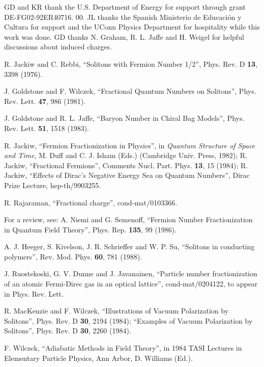 \documentclass[a4paper,prd]{revtex4}
\begin{document}
\begin{acknowledgments}
GD and KR thank the U.S. Department of Energy for support through grant
DE-FG02-92ER40716. 00.  JL thanks the Spanish Ministerio de Educaci\'on y
Cultura for support and the UConn Physics Department for hospitality
while this work was done. GD thanks N. Graham, R. L. Jaffe and H. Weigel
for helpful discussions about induced charges.
\end{acknowledgments}


\begin{thebibliography}{99}

 R.  Jackiw and C.  Rebbi,  ``Solitons with Fermion Number 1/2'', 
Phys.  Rev.  D {\bf 13}, 3398 (1976). 

 J.  Goldstone and F.  Wilczek,  ``Fractional Quantum Numbers
on Solitons'',  Phys.  Rev.  Lett.  {\bf 47}, 986 (1981). 

 J.  Goldstone and R. L.  Jaffe,  ``Baryon Number in Chiral
Bag Models'',  Phys.  Rev.  Lett.  {\bf 51}, 1518 (1983). 

 R.  Jackiw,  ``Fermion Fractionization in Physics'',  
in {\it Quantum Structure of Space and Time},  M.  Duff and C. J.  Isham
(Eds.) (Cambridge Univ.  Press,  1982); R.  Jackiw, ``Fractional
Fermions'',  Comments Nucl.  Part.  Phys.  {\bf 13}, 15 (1984); R. 
Jackiw, ``Effects of Dirac's Negative Energy Sea on Quantum Numbers'',
Dirac Prize Lecture, hep-th/9903255.

 R. Rajaraman, ``Fractional charge'',
cond-mat/0103366. 

 For a review, see: A.  Niemi and G.  Semenoff, 
``Fermion Number Fractionization in Quantum Field Theory'',  Phys.  Rep. 
{\bf 135}, 99 (1986). 

 A. J.  Heeger,  S.  Kivelson,  J. R. Schrieffer and
W.  P.  Su,  ``Solitons in conducting polymers'',  Rev.  Mod.  Phys. 
{\bf 60}, 781 (1988). 

 J. Ruostekoski, G. V. Dunne and J. Javanainen, ``Particle
number fractionization of an atomic Fermi-Direc gas in an optical
lattice'', cond-mat/0204122, to appear in Phys. Rev. Lett.

 R.  MacKenzie and F.  Wilczek,  ``Illustrations of Vacuum 
Polarization by Solitons'',  Phys.  Rev.  D {\bf 30}, 2194 (1984);
``Examples of Vacuum Polarization by Solitons'',  Phys.  Rev.  D {\bf
30}, 2260 (1984). 

 F.  Wilczek,  ``Adiabatic Methods in Field Theory'',  in 1984 
TASI Lectures in Elementary Particle Physics,  Ann Arbor,  
D.  Williams (Ed.). 


\end{thebibliography}
\end{document}

